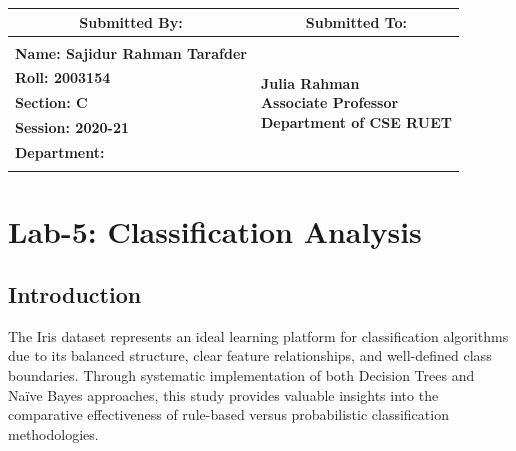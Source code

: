 \documentclass[12pt,a4paper]{article}
\begin{document}
\begin{titlepage}
    
    \begin{table}[h!]
    \centering
    \setlength{\arrayrulewidth}{1.5pt}
    \renewcommand{\arraystretch}{1.5}
    \begin{tabular}{|p{8.5cm}|p{6.5cm}|}
        \hline
        \multicolumn{1}{|c|}{\large \textbf{Submitted By:}} & \multicolumn{1}{c|}{\large \textbf{Submitted To:}} \\
        \hline
        & \\
        \large \textbf{Name: Sajidur Rahman Tarafder} & \multirow{5}{*}{\parbox{6.5cm}{\centering 
        \large \textbf{Julia Rahman} \\ 
        \vspace{0.2cm}
        \large \textbf{Associate Professor} \\ 
        \vspace{0.2cm}
        \large \textbf{Department of CSE RUET} \\ 
        \vspace{0.4cm}}} \\
        \large \textbf{Roll: 2003154} & \\
        \large \textbf{Section: C} & \\
        \large \textbf{Session: 2020-21} & \\
        \large \textbf{Department:} & \\
        & \\
        \hline
    \end{tabular}
    \end{table}
    
    \vspace{0.5cm}
\end{titlepage}

\newpage
\thispagestyle{fancy}
\tableofcontents
\newpage

\section{ Lab-5: Classification Analysis }

\subsection{Introduction}
The Iris dataset represents an ideal learning platform for classification algorithms due to its balanced structure, clear feature relationships, and well-defined class boundaries. Through systematic implementation of both Decision Trees and Na\"{i}ve Bayes approaches, this study provides valuable insights into the comparative effectiveness of rule-based versus probabilistic classification methodologies.
\end{document}
